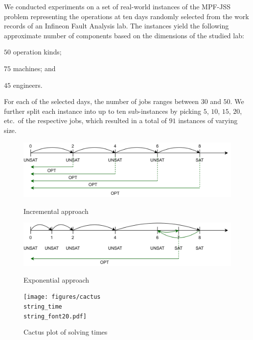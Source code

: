 \documentclass[submission,copyright,creativecommons]{eptcs}
\newcommand{\jss}{MPF-JSS\xspace}
\begin{document}
We conducted experiments on a set of real-world instances of the \jss problem 
representing the operations at ten days randomly selected from the work
records of an Infineon Fault Analysis lab.
%
The instances yield the following approximate number of components based on the dimensions of the studied lab:
\begin{enumerate*}[label=\emph{(\roman*)}]
	\item $50$ operation kinds;
	\item $75$ machines; and 
	\item $45$ engineers.
\end{enumerate*}
For each of the selected days, the number of jobs ranges between $30$ and $50$.
We further split each instance into up to ten sub-instances by picking
$5$, $10$, $15$, $20$, etc.\ of the respective jobs,
which resulted in a total of $91$ instances of varying size. %
%
\begin{figure}
	\begin{minipage}[b]{.5\textwidth}
		\includegraphics[width=.9\linewidth]{figures/incremental.pdf}
		\caption{Incremental approach \label{fig:inc}}
			\smallskip %
			\bigskip
		\includegraphics[width=.9\linewidth]{figures/exponential.pdf}
		\caption{Exponential approach \label{fig:exp}}
	\end{minipage}%
	\begin{minipage}[b]{.5\textwidth}
		\texttt{[image: figures/cactus\\string\_time\\string\_font20.pdf]}
		\caption{Cactus plot of solving times \label{fig:cactus:time}}
	\end{minipage}
\end{figure}
\end{document}
